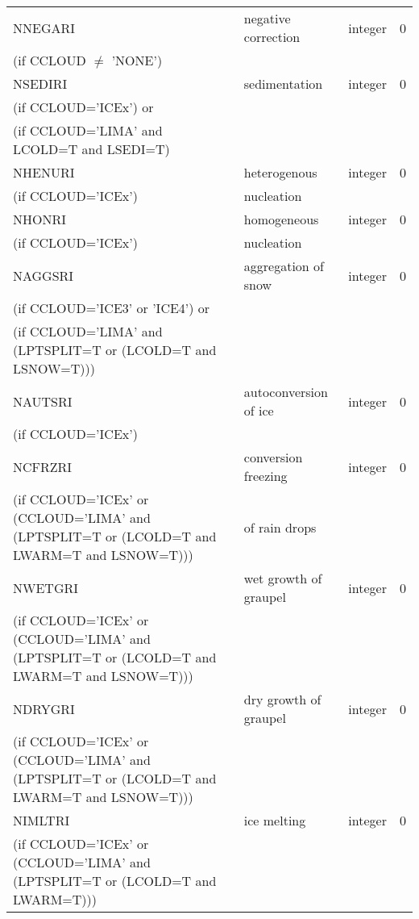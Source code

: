 \begin{longtable} {|p{}|p{}|>{\centering}p{}|p{}<{\centering}|}
NNEGARI  & negative correction & integer  &  0 \index{NNEGARI!\innam{NAM\_BU\_RRI}}\\ \nopagebreak
(if CCLOUD $\neq$ 'NONE') & &   &  \\\hline
NSEDIRI  & sedimentation  & integer  &  0 \index{NSEDIRI!\innam{NAM\_BU\_RRI}}\\ \nopagebreak
(if CCLOUD='ICEx') or & &   &  \\ \nopagebreak
(if CCLOUD='LIMA' and LCOLD=T and LSEDI=T) & &   &  \\\hline
NHENURI  & heterogenous   & integer  &  0 \index{NHENURI!\innam{NAM\_BU\_RRI}}\\ \nopagebreak
(if CCLOUD='ICEx') &nucleation &   &  \\\hline
NHONRI  & homogeneous   & integer  &  0 \index{NHONRI!\innam{NAM\_BU\_RRI}}\\ \nopagebreak
(if CCLOUD='ICEx') &nucleation &   &  \\\hline
NAGGSRI & aggregation of snow & integer  &  0 \index{NAGGSRI!\innam{NAM\_BU\_RRI}}\\ \nopagebreak
(if CCLOUD='ICE3' or 'ICE4') or & &   &  \\ \nopagebreak
(if CCLOUD='LIMA' and (LPTSPLIT=T or (LCOLD=T and LSNOW=T))) & &   &  \\\hline
NAUTSRI & autoconversion of ice & integer  &  0 \index{NAUTSRI!\innam{NAM\_BU\_RRI}}\\ \nopagebreak
(if CCLOUD='ICEx') & &   &  \\\hline
NCFRZRI &   conversion freezing  & integer  &  0 \index{NCFRZRI!\innam{NAM\_BU\_RRI}}\\ \nopagebreak
(if CCLOUD='ICEx' or (CCLOUD='LIMA' and (LPTSPLIT=T or (LCOLD=T and LWARM=T and LSNOW=T))) & of rain drops & & \\\hline
NWETGRI &   wet growth of graupel & integer  &  0 \index{NWETGRI!\innam{NAM\_BU\_RRI}}\\ \nopagebreak
(if CCLOUD='ICEx' or (CCLOUD='LIMA' and (LPTSPLIT=T or (LCOLD=T and LWARM=T and LSNOW=T))) & & & \\\hline
NDRYGRI &   dry growth of graupel & integer  &  0 \index{NDRYGRI!\innam{NAM\_BU\_RRI}}\\ \nopagebreak
(if CCLOUD='ICEx' or (CCLOUD='LIMA' and (LPTSPLIT=T or (LCOLD=T and LWARM=T and LSNOW=T))) & & & \\\hline
NIMLTRI &   ice melting & integer  &  0 \index{NIMLRI!\innam{NAM\_BU\_RRI}}\\ \nopagebreak
(if CCLOUD='ICEx' or (CCLOUD='LIMA' and (LPTSPLIT=T or (LCOLD=T and LWARM=T))) & &   &  \\\hline

\end{longtable}
